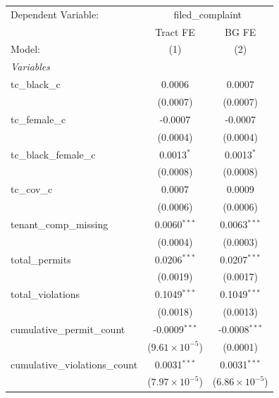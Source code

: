 \begingroup
\centering
\begin{tabular}{lcc}
   \tabularnewline \midrule \midrule
   Dependent Variable: & \multicolumn{2}{c}{filed\_complaint}\\
                                   & Tract FE                & BG FE \\   
   Model:                          & (1)                     & (2)\\  
   \midrule
   \emph{Variables}\\
   tc\_black\_c                    & 0.0006                  & 0.0007\\   
                                   & (0.0007)                & (0.0007)\\   
   tc\_female\_c                   & -0.0007                 & -0.0007\\   
                                   & (0.0004)                & (0.0004)\\   
   tc\_black\_female\_c            & 0.0013$^{*}$            & 0.0013$^{*}$\\   
                                   & (0.0008)                & (0.0008)\\   
   tc\_cov\_c                      & 0.0007                  & 0.0009\\   
                                   & (0.0006)                & (0.0006)\\   
   tenant\_comp\_missing           & 0.0060$^{***}$          & 0.0063$^{***}$\\   
                                   & (0.0004)                & (0.0003)\\   
   total\_permits                  & 0.0206$^{***}$          & 0.0207$^{***}$\\   
                                   & (0.0019)                & (0.0017)\\   
   total\_violations               & 0.1049$^{***}$          & 0.1049$^{***}$\\   
                                   & (0.0018)                & (0.0013)\\   
   cumulative\_permit\_count       & -0.0009$^{***}$         & -0.0008$^{***}$\\   
                                   & ($9.61\times 10^{-5}$)  & (0.0001)\\   
   cumulative\_violations\_count   & 0.0031$^{***}$          & 0.0031$^{***}$\\   
                                   & ($7.97\times 10^{-5}$)  & ($6.86\times 10^{-5}$)\\    

\end{tabular}
